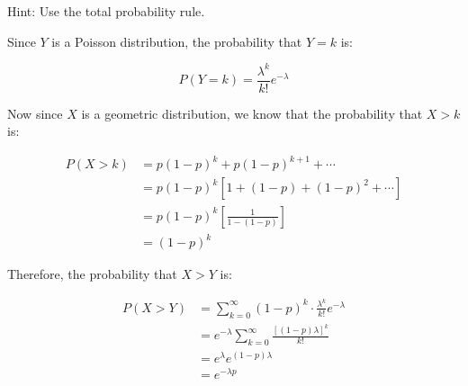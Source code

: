\documentclass[11pt]{article}
\begin{document}
Hint: Use the total probability rule.

\begin{solution}
    Since $Y$ is a Poisson distribution, the probability that $Y = k$ is: 

    \[ P(Y = k) = \frac{\lambda^k}{k!} e^{-\lambda}\]

    Now since $X$ is a geometric distribution, we know that the probability that $X > k$ is: 

    \begin{align*}
        P(X > k) &= p(1-p)^k + p(1-p)^{k+1} + \cdots\\
        &= p(1-p)^k\left[ 1 + (1-p) + (1-p)^2 + \cdots\right]\\
        &= p(1-p)^k\left[ \frac{1}{1 - (1-p)}\right] \\
        &= (1-p)^k
    \end{align*}

    Therefore, the probability that $X > Y$ is: 

    \begin{align*}
        P(X > Y) &= \sum_{k = 0}^{\infty} (1-p)^k \cdot \frac{\lambda^k}{k!} e^{-\lambda}\\
        &= e^{-\lambda} \sum_{k = 0}^\infty \frac{\left[(1-p)\lambda\right]^k}{k!}\\
        &= e^{\lambda}e^{(1-p) \lambda}\\
        &= e^{-\lambda p}
    \end{align*}
\end{solution}
\pagebreak 
{}
\end{document}

